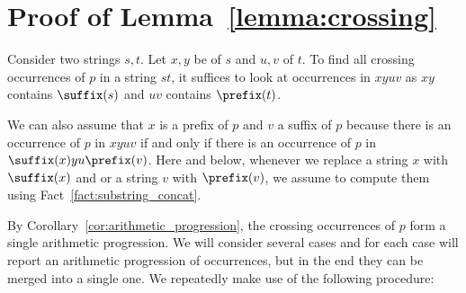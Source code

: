 \section{Proof of Lemma~\ref{lemma:crossing}}\label{pmgapped:sec:prooflem1}

Consider two strings $s,t$. Let $x, y$ be  of $s$ and $u, v$  of $t$. To find all crossing occurrences of $p$ in a string $st$, it suffices to look at occurrences in $xyuv$ as $xy$ contains $\suffix(s)$ and $uv$ contains $\prefix(t)$.

We can also assume that $x$ is a prefix of $p$ and $v$ a suffix of $p$ because there is an occurrence of $p$ in $xyuv$ if and only if there is an occurrence of $p$ in $\suffix(x) y u\prefix(v)$. Here and below, whenever we replace a string $x$ with $\suffix(x)$ and or a string $v$ with $\prefix(v)$, we assume to compute them using Fact~\ref{fact:substring_concat}. 

By Corollary~\ref{cor:arithmetic_progression}, the crossing occurrences of $p$ form a single arithmetic progression. 
We will consider several cases and for each case will report an arithmetic progression of occurrences, but in the end they can be merged into a single one. We repeatedly make use of the following procedure:

